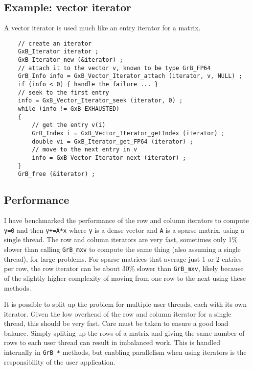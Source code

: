 \documentclass[12pt]{article}
\begin{document}
\subsection{Example: vector iterator}

A vector iterator is used much like an entry iterator for a matrix.

    {\footnotesize
    \begin{verbatim}
    // create an iterator
    GxB_Iterator iterator ;
    GxB_Iterator_new (&iterator) ;
    // attach it to the vector v, known to be type GrB_FP64
    GrB_Info info = GxB_Vector_Iterator_attach (iterator, v, NULL) ;
    if (info < 0) { handle the failure ... }
    // seek to the first entry
    info = GxB_Vector_Iterator_seek (iterator, 0) ;
    while (info != GxB_EXHAUSTED)
    {
        // get the entry v(i)
        GrB_Index i = GxB_Vector_Iterator_getIndex (iterator) ;
        double vi = GxB_Iterator_get_FP64 (iterator) ;
        // move to the next entry in v
        info = GxB_Vector_Iterator_next (iterator) ;
    }
    GrB_free (&iterator) ; \end{verbatim}}

\newpage
\subsection{Performance}

I have benchmarked the performance of the row and column iterators to compute
\verb'y=0' and then \verb'y+=A*x' where \verb'y' is a dense vector and \verb'A'
is a sparse matrix, using a single thread.  The row and column iterators are
very fast, sometimes only 1\% slower than calling \verb'GrB_mxv' to compute the
same thing (also assuming a single thread), for large problems.  For sparse
matrices that average just 1 or 2 entries per row, the row iterator can be
about 30\% slower than \verb'GrB_mxv', likely because of the slightly higher
complexity of moving from one row to the next using these methods.

It is possible to split up the problem for multiple user threads, each with its
own iterator.  Given the low overhead of the row and column iterator for a
single thread, this should be very fast.  Care must be taken to ensure a good
load balance.  Simply spliting up the rows of a matrix and giving the same
number of rows to each user thread can result in imbalanced work.  This is
handled internally in \verb'GrB_*' methods, but enabling parallelism when using
iterators is the responsibility of the user application.
\end{document}
